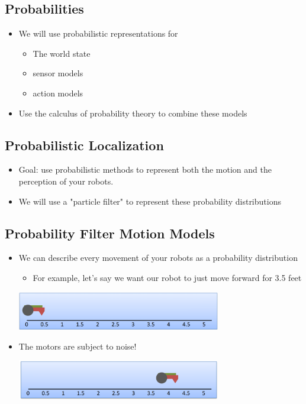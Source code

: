 \documentclass[10pt]{article}
\begin{document}
\subsection*{Probabilities}
\begin{itemize}
	\item We will use probabilistic representations for 
	\begin{itemize}
        \item The world state
        \item sensor models
        \item action models
    \end{itemize}
    \item Use the calculus of probability theory to combine these models
\end{itemize}

\subsection*{Probabilistic Localization}
\begin{itemize}
	\item Goal: use probabilistic methods to represent both the motion and the perception of your robots.
	\item We will use a "particle filter" to represent these probability distributions
\end{itemize}

\subsection*{Probability Filter Motion Models}
\begin{itemize}
	\item We can describe every movement of your robots as a probability distribution
	\begin{itemize}
        \item For example, let's say we want our robot to just move forward for 3.5 feet
    \end{itemize}
    \begin{center} 
        \includegraphics*[width=0.7\textwidth]{L1_2.png} 
    \end{center}
    \item The motors are subject to noise!
    \begin{center} 
        \includegraphics*[width=0.7\textwidth]{L1_3.png} 
    \end{center}
\end{itemize}
\end{document}
